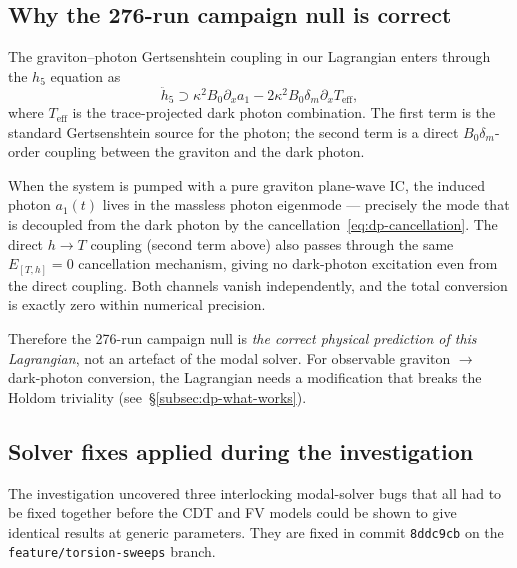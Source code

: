 \subsection{Why the 276-run campaign null is correct}
\label{subsec:dp-campaign-interpretation}

The graviton--photon Gertsenshtein coupling in our Lagrangian enters
through the $h_5$ equation as
\begin{equation}
  \ddot{h}_5 \supset \kappa^2 B_0 \partial_x a_1
       - 2 \kappa^2 B_0 \delta_m \partial_x T_{\text{eff}},
\end{equation}
where $T_{\text{eff}}$ is the trace-projected dark photon combination.
The first term is the standard Gertsenshtein source for the photon;
the second term is a direct $B_0 \delta_m$-order coupling between
the graviton and the dark photon.

When the system is pumped with a pure graviton plane-wave IC, the
induced photon $a_1(t)$ lives in the massless photon eigenmode ---
precisely the mode that is decoupled from the dark photon by the
cancellation~\eqref{eq:dp-cancellation}. The direct $h \to T$
coupling (second term above) also passes through the same
$E_{[T, h]} = 0$ cancellation mechanism, giving no dark-photon
excitation even from the direct coupling. Both channels vanish
independently, and the total conversion is exactly zero within
numerical precision.

Therefore the 276-run campaign null is \emph{the correct physical
prediction of this Lagrangian}, not an artefact of the modal
solver. For observable graviton $\to$ dark-photon conversion, the
Lagrangian needs a modification that breaks the Holdom triviality
(see~\S\ref{subsec:dp-what-works}).

\subsection{Solver fixes applied during the investigation}
\label{subsec:dp-solver-fixes}

The investigation uncovered three interlocking modal-solver bugs
that all had to be fixed together before the CDT and FV models
could be shown to give identical results at generic parameters.
They are fixed in commit \texttt{8ddc9cb} on the
\texttt{feature/torsion-sweeps} branch.

